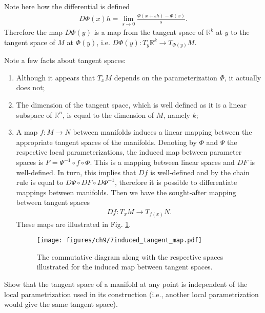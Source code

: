 Note here how the differential is defined
\begin{align}
	D \Phi(x)h = \lim_{s \to 0} \frac{\Phi(x + sh) - \Phi(x)}{s}.
\end{align}
Therefore the map $D\Phi(y)$ is a map from the tangent space of $\mathbb{R}^{k}$ at $y$ to the tangent space of $M$ at $\Phi(y)$, i.e. $D\Phi(y): T_{y}\mathbb{R}^{k}\to T_{\Phi(y)}M$. 

\begin{remark}[]
	Note a few facts about tangent spaces:
	\begin{enumerate}
		\item Although it appears that $T_{x}M$ depends on the parameterization $\Phi$, it actually does not;
		\item The dimension of the tangent space, which is well defined as it is a linear subspace of $\mathbb{R}^{n}$, is equal to the dimension of $M$, namely $k$;
		\item A map $f:M\to N$ between manifolds induces a linear mapping between the appropriate tangent spaces of the manifolds. Denoting by $\Phi$ and $\Psi$ the respective local parameterizations, the induced map between parameter spaces is $F= \Psi^{-1} \circ f \circ \Phi$. This is a mapping between linear spaces and $DF$ is well-defined. In turn, this implies that $Df$ is well-defined and by the chain rule is equal to $D\Psi \circ DF \circ D\Phi^{-1}$, therefore it is possible to differentiate mappings between manifolds. Then we have the sought-after mapping between tangent spaces 
			\begin{align}
				Df: T_{x}M \to T_{f(x)}N.
			\end{align}
			These maps are illustrated in Fig. \ref{fig:induced_tangent_map}.
			\begin{figure}[h!]
				\centering
				\texttt{[image: figures/ch9/7induced\_tangent\_map.pdf]}
				\caption{The commutative diagram along with the respective spaces illustrated for the induced map between tangent spaces.}
				\label{fig:induced_tangent_map}
			\end{figure}
	\end{enumerate}
\end{remark}

\begin{exercise}
Show that the tangent space of a manifold at any point is independent of the local parametrization used in its construction (i.e., another local parametrization would give the same tangent space).
\end{exercise}

